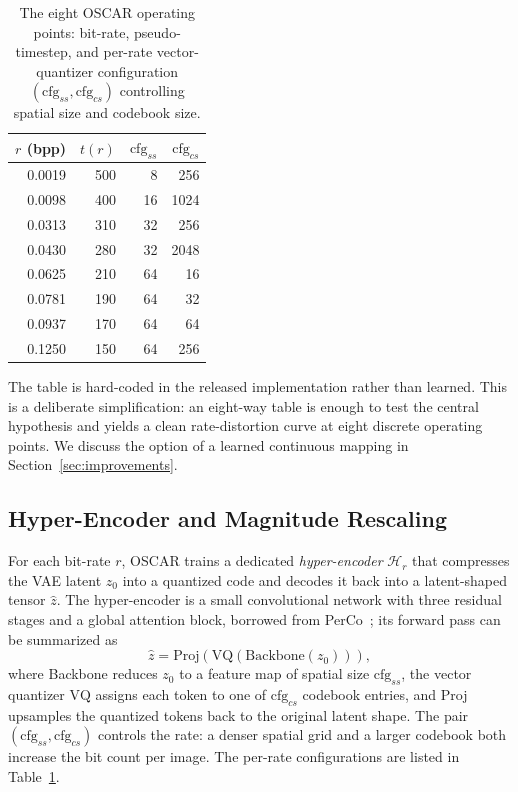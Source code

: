 \documentclass[conference]{IEEEtran}
\begin{document}
\begin{table}[h]
\caption{The eight OSCAR operating points: bit-rate, pseudo-timestep, and per-rate vector-quantizer configuration $(\text{cfg}_{ss}, \text{cfg}_{cs})$ controlling spatial size and codebook size.}
\label{tab:bpps}
\begin{center}
\begin{tabular}{rrrr}
\toprule
$r$ (bpp) & $t(r)$ & $\text{cfg}_{ss}$ & $\text{cfg}_{cs}$ \\
\midrule
0.0019 & 500 & 8  & 256 \\
0.0098 & 400 & 16 & 1024 \\
0.0313 & 310 & 32 & 256 \\
0.0430 & 280 & 32 & 2048 \\
0.0625 & 210 & 64 & 16 \\
0.0781 & 190 & 64 & 32 \\
0.0937 & 170 & 64 & 64 \\
0.1250 & 150 & 64 & 256 \\
\bottomrule
\end{tabular}
\end{center}
\end{table}

The table is hard-coded in the released implementation rather than learned. This
is a deliberate simplification: an eight-way table is enough to test the
central hypothesis and yields a clean rate-distortion curve at eight discrete
operating points. We discuss the option of a learned continuous mapping in
Section~\ref{sec:improvements}.

\subsection{Hyper-Encoder and Magnitude Rescaling}

For each bit-rate $r$, OSCAR trains a dedicated \emph{hyper-encoder}
$\mathcal{H}_r$ that compresses the VAE latent $z_0$ into a quantized code and
decodes it back into a latent-shaped tensor $\hat{z}$. The hyper-encoder is a
small convolutional network with three residual stages and a global attention
block, borrowed from PerCo~\cite{perco}; its forward pass can be summarized as
\begin{equation}
\hat{z} = \text{Proj}\!\left(\text{VQ}\!\left(\text{Backbone}(z_0)\right)\right),
\label{eq:hyper}
\end{equation}
where Backbone reduces $z_0$ to a feature map of spatial size $\text{cfg}_{ss}$,
the vector quantizer $\text{VQ}$ assigns each token to one of $\text{cfg}_{cs}$
codebook entries, and Proj upsamples the quantized tokens back to the original
latent shape. The pair $(\text{cfg}_{ss}, \text{cfg}_{cs})$ controls the rate: a
denser spatial grid and a larger codebook both increase the bit count per image.
The per-rate configurations are listed in Table~\ref{tab:bpps}.
\end{document}
